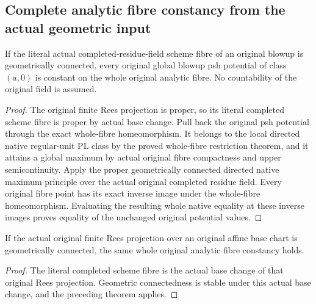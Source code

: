 \subsection{Complete analytic fibre constancy from the actual geometric input}

\begin{theorem}
\label{thm:fc-analytic-constancy-completed-geometrically-connected}
\leanok
{}
If the literal actual completed-residue-field scheme fibre of an original
blowup is geometrically connected, every original global blowup psh potential
of class $(a,0)$ is constant on the whole original analytic fibre. No
countability of the original field is assumed.
\end{theorem}
\begin{proof}
The original finite Rees projection is proper, so its literal completed scheme
fibre is proper by actual base change. Pull back the original psh potential
through the exact whole-fibre homeomorphism. It belongs to the local directed
native regular-unit PL class by the proved whole-fibre restriction theorem,
and it attains a global maximum by actual original fibre compactness and
upper semicontinuity. Apply the proper geometrically connected directed
native maximum principle over the actual original completed residue field.
Every original fibre point has its exact inverse image under the whole-fibre
homeomorphism. Evaluating the resulting whole native equality at these inverse
images proves equality of the unchanged original potential values.
\end{proof}

\begin{corollary}
\label{cor:fc-analytic-constancy-original-geometrically-connected-rees}
\leanok
{}
If the actual original finite Rees projection over an original affine base
chart is geometrically connected, the same whole original analytic fibre
constancy holds.
\end{corollary}
\begin{proof}
The literal completed scheme fibre is the actual base change of that original
Rees projection. Geometric connectedness is stable under this actual base
change, and the preceding theorem applies.
\end{proof}

